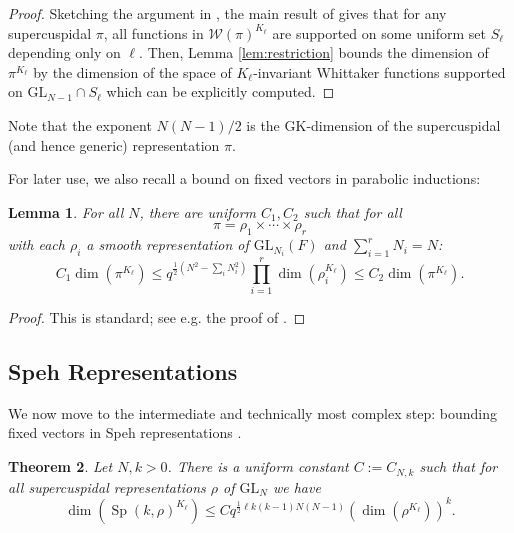 \documentclass{amsart}
\newcommand{\lf}{\left}
\newcommand{\ri}{\right}
\newcommand{\f}{\frac}
\newcommand{\mc}[1]{\mathcal{#1}}
\newcommand{\GL}{\mathrm{GL}}
\newcommand{\1}{\m 1}
\DeclareMathOperator{\Speh}{\mathrm{Sp}}
\newtheorem{thm}{Theorem}[subsection]
\newtheorem{lem}[thm]{Lemma}
\theoremstyle{remark}
\theoremstyle{definition}
\numberwithin{equation}{subsection}
\begin{document}
\begin{proof}
Sketching the argument in \cite{MS19}, the main result of \cite{Lap19} gives that for any supercuspidal $\pi$, all functions in $\mc W(\pi)^{K_\ell}$ are supported on some uniform set $S_\ell$ depending only on $\ell$. Then, Lemma \ref{lem:restriction} bounds the dimension of $\pi^{K_\ell}$ by the dimension of the space of $K_\ell$-invariant Whittaker functions supported on $\GL_{N-1} \cap S_\ell$ which can be explicitly computed. 
\end{proof}
Note that the exponent $N(N-1)/2$ is the GK-dimension of the supercuspidal (and hence generic) representation $\pi$. 

For later use, we also recall a bound on fixed vectors in parabolic inductions:
\begin{lem}\label{lem:inductionbound}
For all $N$, there are uniform $C_1, C_2$ such that for all 
\[
\pi = \rho_1 \times \cdots \times \rho_r
\]
with each $\rho_i$ a smooth representation of $\GL_{N_i}(F)$ and $\sum_{i=1}^r N_i = N$:
\[
C_1 \dim(\pi^{K_\ell}) \leq q^{\f12(N^2 - \sum_i N_i^2)} \prod_{i=1}^r \dim(\rho_i^{K_\ell}) \leq C_2 \dim(\pi^{K_\ell}). 
\]
\end{lem}

\begin{proof}
This is standard; see e.g. the proof of \cite[Lem 5.2]{MS19}. 
\end{proof}


\subsection{Speh Representations}
We now move to the intermediate and technically most complex step: bounding fixed vectors in Speh representations%
.


\begin{thm}\label{thm:pre speh bound}
Let $N,k > 0$. There is a uniform constant $C := C_{N,k}$ such that for all supercuspidal representations $\rho$ of $\GL_N$ we have
\[
\dim(\Speh(k, \rho)^{K_\ell}) \leq C q^{\f12 \ell k(k-1)N(N-1)} \lf(\dim(\rho^{K_\ell})\ri)^k.
\]
\end{thm}
\end{document}
